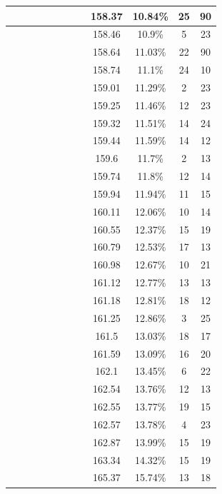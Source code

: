 \begin{center}
\begin{longtable}{|c|c|c|c|c|c|c|c|c|c|c|c|}
 \x &  &  &  \x &  \x &  &  &  \x & 158.37 & 10.84\% & 25 & 90 \\ \hline
 \x &  \x &  &  &  \x &  &  \x &  & 158.46 & 10.9\% & 5 & 23 \\ \hline
 \x &  \x &  &  \x &  \x &  &  &  \x & 158.64 & 11.03\% & 22 & 90 \\ \hline
 \x &  \x &  &  &  &  &  \x &  \x & 158.74 & 11.1\% & 24 & 10 \\ \hline
 \x &  \x &  &  &  \x &  \x &  \x &  & 159.01 & 11.29\% & 2 & 23 \\ \hline
 \x &  &  \x &  &  \x &  &  \x &  \x & 159.25 & 11.46\% & 12 & 23 \\ \hline
 \x &  \x &  \x &  \x &  \x &  &  \x &  & 159.32 & 11.51\% & 14 & 24 \\ \hline
 \x &  \x &  \x &  &  \x &  &  \x &  \x & 159.44 & 11.59\% & 14 & 12 \\ \hline
 \x &  &  \x &  &  &  \x &  \x &  \x & 159.6 & 11.7\% & 2 & 13 \\ \hline
 \x &  \x &  \x &  &  \x &  &  &  & 159.74 & 11.8\% & 12 & 14 \\ \hline
 \x &  &  &  \x &  &  &  \x &  \x & 159.94 & 11.94\% & 11 & 15 \\ \hline
 \x &  \x &  &  \x &  &  \x &  \x &  & 160.11 & 12.06\% & 10 & 14 \\ \hline
 \x &  \x &  \x &  \x &  \x &  &  &  & 160.55 & 12.37\% & 15 & 19 \\ \hline
 \x &  &  &  &  \x &  &  \x &  \x & 160.79 & 12.53\% & 17 & 13 \\ \hline
 \x &  &  &  &  &  &  \x &  & 160.98 & 12.67\% & 10 & 21 \\ \hline
 \x &  \x &  &  \x &  \x &  &  \x &  & 161.12 & 12.77\% & 13 & 13 \\ \hline
 \x &  &  &  &  &  &  \x &  \x & 161.18 & 12.81\% & 18 & 12 \\ \hline
 \x &  &  \x &  &  &  &  \x &  \x & 161.25 & 12.86\% & 3 & 25 \\ \hline
 \x &  &  \x &  \x &  \x &  &  &  \x & 161.5 & 13.03\% & 18 & 17 \\ \hline
 \x &  &  &  &  \x &  &  \x &  & 161.59 & 13.09\% & 16 & 20 \\ \hline
 \x &  \x &  &  \x &  &  &  \x &  \x & 162.1 & 13.45\% & 6 & 22 \\ \hline
 \x &  &  \x &  &  \x &  &  \x &  & 162.54 & 13.76\% & 12 & 13 \\ \hline
 \x &  \x &  &  \x &  \x &  &  &  & 162.55 & 13.77\% & 19 & 15 \\ \hline
 \x &  &  &  \x &  &  \x &  \x &  \x & 162.57 & 13.78\% & 4 & 23 \\ \hline
 \x &  &  &  \x &  \x &  &  &  & 162.87 & 13.99\% & 15 & 19 \\ \hline
 \x &  &  &  \x &  \x &  &  \x &  & 163.34 & 14.32\% & 15 & 19 \\ \hline
 \x &  &  \x &  \x &  \x &  \x &  &  & 165.37 & 15.74\% & 13 & 18 \\ \hline
\end{longtable}
\label{table:windProdInputParamsSeasonal}
\end{center}
\normalsize


